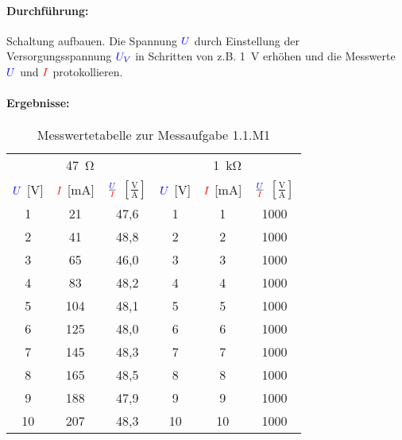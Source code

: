 \documentclass[a4paper,titlepage,parskip]{scrreprt}
\newcommand{\spannung}[1]{\textcolor{blue}{#1}}
\newcommand{\strom}[1]{\textcolor{red}{#1}}
\begin{document}
            \paragraph{Durchführung:} Schaltung aufbauen. Die Spannung $\spannung{U}$ durch Einstellung der Versorgungsspannung $\spannung{U_V}$ in Schritten von z.B. \SI{1}{\volt} erhöhen und die Messwerte $\spannung{U}$ und $\strom{I}$ protokollieren. 
          \paragraph{Ergebnisse:}
                 \begin{center}
                    \begin{table}[!hbtp]
                        \caption{Messwertetabelle zur Messaufgabe 1.1.M1}
                        \label{tbl:messergebnisse1.1}
                        \renewcommand{\arraystretch}{1.3}
                        \begin{center}
                            \begin{tabular}{ccc|ccc}
                                \multicolumn{3}{c}{\SI{47}{\ohm}} & \multicolumn{3}{c}{\SI{1}{\kilo\ohm}} \\ 
                                $\spannung{U}$ [\si{\volt}] &
                                $\strom{I}$ [\si{\milli\ampere}] &
                                $\frac{\spannung{U}}{\strom{I}}$ $\left[\frac{\si{\volt}}{\si{\ampere}}\right]$&
                                $\spannung{U}$ [\si{\volt}] &
                                $\strom{I}$ [\si{\milli\ampere}] &
                                $\frac{\spannung{U}}{\strom{I}}$ $\left[\frac{\si{\volt}}{\si{\ampere}}\right]$ \\ \hline
                                
                                1 & 21 & 47,6 & 1 & 1 & 1000\\
                                2 & 41 & 48,8 & 2 & 2 & 1000\\
                                3 & 65 & 46,0 & 3 & 3 & 1000\\
                                4 & 83 & 48,2 & 4 & 4 & 1000\\
                                5 & 104 & 48,1 & 5 & 5 & 1000\\
                                6 & 125 & 48,0 & 6 & 6 & 1000\\
                                7 & 145 & 48,3 & 7 & 7 & 1000\\
                                8 & 165 & 48,5 & 8 & 8 & 1000\\
                                9 & 188 & 47,9 & 9 & 9 & 1000\\
                                10 & 207 & 48,3 & 10 & 10 & 1000\\
                            \end{tabular}
                        \end{center}
                    \end{table}
                \end{center}
\end{document}
